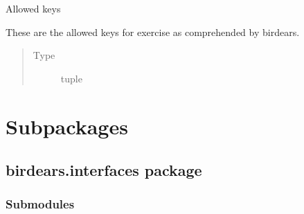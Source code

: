 \documentclass[letterpaper,10pt,english]{sphinxmanual}
\begin{document}

\begin{fulllineitems}
\label{\detokenize{birdears:birdears.KEYS}}
\sphinxAtStartPar
Allowed keys

\sphinxAtStartPar
These are the allowed keys for exercise as comprehended by birdears.
\begin{quote}\begin{description}
\item[{Type}] \leavevmode
\sphinxAtStartPar
tuple

\end{description}\end{quote}

\end{fulllineitems}



\section{Subpackages}
\label{\detokenize{birdears:subpackages}}

\subsection{birdears.interfaces package}
\label{\detokenize{birdears.interfaces:module-birdears.interfaces}}\label{\detokenize{birdears.interfaces:birdears-interfaces-package}}\label{\detokenize{birdears.interfaces::doc}}

\subsubsection{Submodules}
\label{\detokenize{birdears.interfaces:submodules}}
\end{document}
